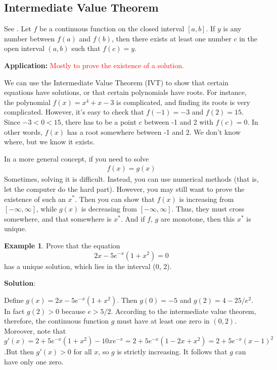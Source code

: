 \documentclass[11pt,a4paper]{book}
\newcommand{\red}[1]{\textcolor{red}{#1}}
\theoremstyle{definition}\newtheorem{definition}{Definition}
\theoremstyle{definition}\newtheorem{fact}{Fact}
\theoremstyle{definition}\newtheorem{remark}{Remark}
\theoremstyle{definition}\newtheorem{ex}{Ex.}
\theoremstyle{definition}\newtheorem{project}{Project}
\theoremstyle{definition}\newtheorem{problem}{Problem}
\theoremstyle{definition}\newtheorem{example}{Example}
\numberwithin{theorem}{section}
\numberwithin{corollary}{chapter}
\numberwithin{assumption}{chapter}
\numberwithin{definition}{chapter}
\numberwithin{prop}{chapter}
\numberwithin{notation}{chapter}
\numberwithin{problem}{chapter}
\numberwithin{example}{chapter}
\numberwithin{fact}{chapter}
\numberwithin{ex}{chapter}
\begin{document}
\begin{appendices}
	
	\section{Intermediate Value Theorem}
	See \citet[Ch 6.10]{springcamp}. Let \( f \) be a continuous function on the closed interval \([a, b]\). If \( y \) is any number between \( f(a) \) and \( f(b) \), then there exists at least one number \( c \) in the open interval \((a, b)\) such that \( f(c) = y \).
	
	\textbf{Application:} \red{Mostly to prove the existence of a solution.}
	
	We can use the Intermediate Value Theorem (IVT) to show that certain equations have solutions, or that certain polynomials have roots. For instance, the polynomial \( f(x) = x^4 + x - 3 \) is complicated, and finding its roots is very complicated. However, it's easy to check that \( f(-1) = -3 \) and \( f(2) = 15 \). Since \( -3 < 0 < 15 \), there has to be a point \( c \) between -1 and 2 with \( f(c) = 0 \). In other words, \( f(x) \) has a root somewhere between -1 and 2. We don't know where, but we know it exists.
	
	In a more general concept, if you need to solve
	\begin{align*}
		f(x) = g(x)
	\end{align*}
	Sometimes, solving it is difficult. Instead, you can use numerical methods (that is, let the computer do the hard part). However, you may still want to prove the existence of such an $x^*$. Then you can show that $f(x)$ is increasing from $[-\infty,\infty]$, while $g(x)$ is decreasing from $[-\infty,\infty]$. Thus, they must cross somewhere, and that somewhere is $x^*$. And if $f$, $g$ are monotone, then this $x^*$ is unique.
	
	\begin{example}
		Prove that the equation
		$$2x - 5e^{-x}(1+x^2)=0$$
		has a unique solution, which lies in the interval (0, 2).
		
		\textbf{Solution}:
		
		Define $g(x) = 2x - 5e^{-x}(1 + x^2)$. Then $g(0) = -5$ and $g(2) = 4 - 25/e^2$. In fact $g(2) > 0$ because $e > 5/2$. According to the intermediate value theorem, therefore, the continuous function $g$ must have at least one zero in $(0, 2)$. Moreover, note that $g'(x) = 2 + 5e^{-x}(1+x^2)-10xe^{-x} =2+5e^{-x}(1-2x+x^2)=2+5e^{-x}(x-1)^2$.But then $g'(x)>0$ for all $x$, so $g$ is strictly increasing. It follows that $g$ can have only one zero.
	\end{example}
	

\end{appendices}
\end{document}
